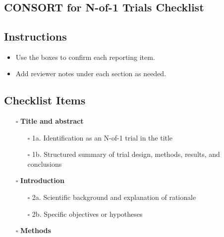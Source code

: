 \documentclass[11pt]{article}
\def\tightlist{}
\begin{document}
\begin{center}
{\LARGE }\\[4pt]
\normalsize 
\end{center}
\vspace{1em}

\begin{Form}

\section{CONSORT for N-of-1 Trials
Checklist}\label{consort-for-n-of-1-trials-checklist}

\subsection{Instructions}\label{instructions}

\begin{itemize}
\tightlist
\item
  Use the boxes to confirm each reporting item.
\item
  Add reviewer notes under each section as needed.
\end{itemize}

\subsection{Checklist Items}\label{checklist-items}

\begin{itemize}
\tightlist
\item[$\square$]
  \textbf{Title and abstract}

  \begin{itemize}
  \tightlist
  \item[$\square$]
    1a. Identification as an N-of-1 trial in the title
  \item[$\square$]
    1b. Structured summary of trial design, methods, results, and
    conclusions
  \end{itemize}
\item[$\square$]
  \textbf{Introduction}

  \begin{itemize}
  \tightlist
  \item[$\square$]
    2a. Scientific background and explanation of rationale
  \item[$\square$]
    2b. Specific objectives or hypotheses
  \end{itemize}
\item[$\square$]
  \textbf{Methods}


\end{itemize}
\end{Form}
\end{document}
